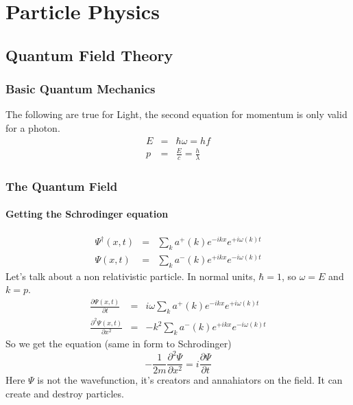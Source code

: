 \chapter{Particle Physics}



\section{Quantum Field Theory}


\subsection{Basic Quantum Mechanics}

The following are true for Light, the second equation for momentum is only valid for a photon.
\begin{eqnarray*}
  E &=& \hbar \omega = h f \\
  p &=& \frac{E}{c} = \frac{h}{\lambda}
\end{eqnarray*}


\subsection{The Quantum Field}

\subsubsection{Getting the Schrodinger equation}

\begin{eqnarray}
  \Psi^\dagger(x, t) &=& \sum_k a^+(k) e^{-ikx} e^{+i\omega(k)t} \\
  \Psi(x, t) &=& \sum_k a^-(k) e^{+ikx} e^{-i\omega(k)t}
\end{eqnarray}
Let's talk about a non relativistic particle. In normal units, $\hbar = 1$, so $\omega = E$ and $k = p$.
\begin{eqnarray}
  \frac{\partial \Psi(x, t)}{\partial t} &=& i\omega \sum_k a^+(k) e^{-ikx} e^{+i\omega(k)t} \\
  \frac{\partial^2 \Psi(x, t)}{\partial x^2} &=& -k^2 \sum_k a^-(k) e^{+ikx} e^{-i\omega(k)t}
\end{eqnarray}
So we get the equation (same in form to Schrodinger)
\begin{equation}
  - \frac{1}{2m} \frac{\partial^2 \Psi}{\partial x^2} = i \frac{\partial \Psi}{\partial t}
\end{equation}
Here $\Psi$ is not the wavefunction, it's creators and annahiators on the field. It can create and destroy particles.


